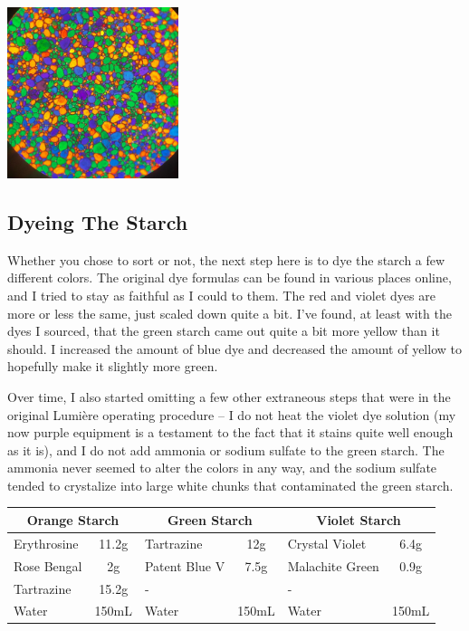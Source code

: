 \documentclass[11pt]{article}
\begin{document}
\begin{center}
\includegraphics[width=5cm, height=5cm]{img/part1_7.jpg}
\end{center}

\subsection{Dyeing The Starch}

Whether you chose to sort or not, the next step here is to dye the starch a few different colors. The original dye formulas can be found in various places online, and I tried to stay as faithful as I could to them. The red and violet dyes are more or less the same, just scaled down quite a bit. I've found, at least with the dyes I sourced, that the green starch came out quite a bit more yellow than it should. I increased the amount of blue dye and decreased the amount of yellow to hopefully make it slightly more green.\newline

Over time, I also started omitting a few other extraneous steps that were in the original Lumière operating procedure -- I do not heat the violet dye solution (my now purple equipment is a testament to the fact that it stains quite well enough as it is), and I do not add ammonia or sodium sulfate to the green starch. The ammonia never seemed to alter the colors in any way, and the sodium sulfate tended to crystalize into large white chunks that contaminated the green starch.\newline

\noindent
\begin{tabular}{|l|c|l|c|l|c|}
	\hline
	\multicolumn{2}{|c|}{Orange Starch} &
	\multicolumn{2}{|c|}{Green Starch} &
	\multicolumn{2}{|c|}{Violet Starch} \\
	\hline
	Erythrosine & 11.2g & Tartrazine & 12g & Crystal Violet & 6.4g \\
	\hline
	Rose Bengal & 2g & Patent Blue V & 7.5g & Malachite Green & 0.9g \\
	\hline
	Tartrazine & 15.2g & - & & - & \\
	\hline
	Water & 150mL & Water & 150mL & Water & 150mL \\
	\hline
\end{tabular}\newline
\end{document}
